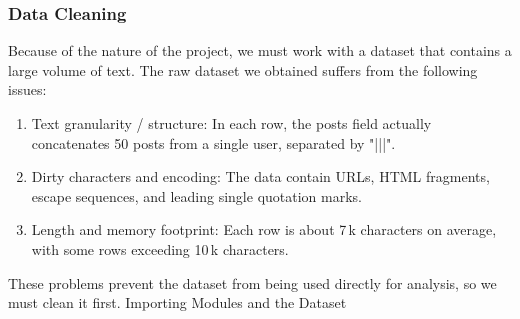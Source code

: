 \documentclass[12pt]{article}
\numberwithin{figure}{section}  %
\begin{document}
\subsubsection{Data Cleaning}
Because of the nature of the project, we must work with a dataset that contains a large volume of text. The raw dataset we obtained suffers from the following issues:
\begin{enumerate}
\item Text granularity / structure: In each row, the posts field actually concatenates 50 posts from a single user, separated by "|||".
\item Dirty characters and encoding: The data contain URLs, HTML fragments, escape sequences, and leading single quotation marks.
\item Length and memory footprint: Each row is about 7 k characters on average, with some rows exceeding 10 k characters.

\end{enumerate}
These problems prevent the dataset from being used directly for analysis, so we must clean it first.
Importing Modules and the Dataset
\end{document}
